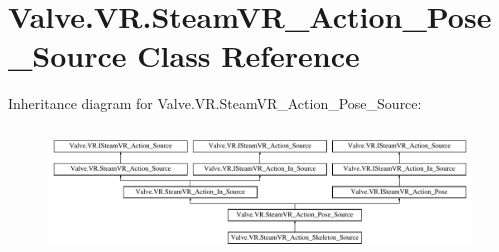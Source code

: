 \hypertarget{class_valve_1_1_v_r_1_1_steam_v_r___action___pose___source}{}\section{Valve.\+V\+R.\+Steam\+V\+R\+\_\+\+Action\+\_\+\+Pose\+\_\+\+Source Class Reference}
\label{class_valve_1_1_v_r_1_1_steam_v_r___action___pose___source}
Inheritance diagram for Valve.\+V\+R.\+Steam\+V\+R\+\_\+\+Action\+\_\+\+Pose\+\_\+\+Source\+:\begin{figure}[H]
\begin{center}
\leavevmode
\includegraphics[height=3.393939cm]{class_valve_1_1_v_r_1_1_steam_v_r___action___pose___source}
\end{center}
\end{figure}

